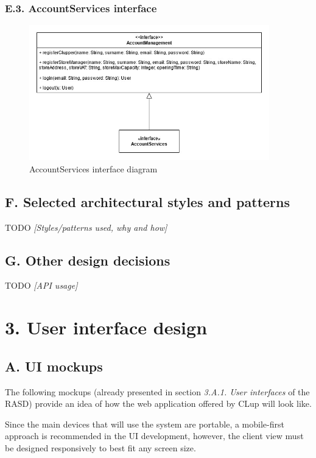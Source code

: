 \subsection{E.3. AccountServices interface}

\begin{figure}[H]
\centering
\includegraphics[width=0.93\textwidth]{assets/dd/component_interface_diagrams/account_management_component_interface_diagram}
\caption{AccountServices interface diagram}
\end{figure}

\section{F. Selected architectural styles and patterns}

TODO \emph{[Styles/patterns used, why and how]}

\section{G. Other design decisions}

TODO \emph{[API usage]}

\chapter{3. User interface design}

\section{A. UI mockups}

The following mockups (already presented in section \emph{3.A.1. User interfaces} of the RASD) provide an idea of how the web application offered by CLup will look like.

Since the main devices that will use the system are portable, a mobile-first approach is recommended in the UI development, however, the client view must be designed responsively to best fit any screen size.

